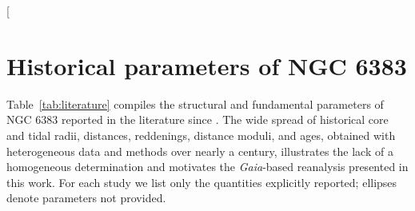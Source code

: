 \documentclass{aa}
\begin{document}
\begin{appendix}
\nolinenumbers
\setlength{\floatsep}{8pt plus 2pt minus 2pt}
\setlength{\dblfloatsep}{8pt plus 2pt minus 2pt}
\setlength{\intextsep}{8pt plus 2pt minus 2pt}

\makeatletter
\def\@captype{table}
\makeatother
\twocolumn[{%
\section{Historical parameters of NGC 6383}\label{app:historical}

Table~\ref{tab:literature} compiles the structural and fundamental parameters of NGC 6383 reported in the literature since \citet{1930LicOB..14..154T}. The wide spread of historical core and tidal radii, distances, reddenings, distance moduli, and ages, obtained with heterogeneous data and methods over nearly a century, illustrates the lack of a homogeneous determination and motivates the \textit{Gaia}-based reanalysis presented in this work. For each study we list only the quantities explicitly reported; ellipses denote parameters not provided.

}
\end{appendix}
\end{document}
